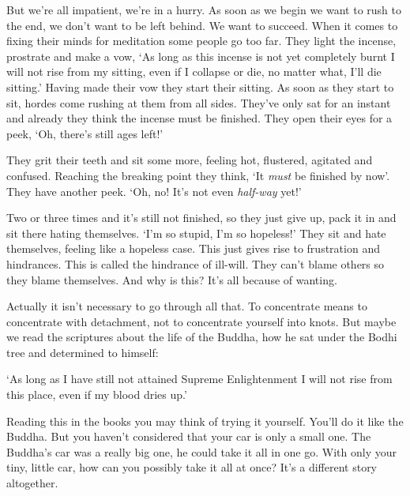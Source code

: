 But we're all impatient, we're in a hurry. As soon as we begin we want to rush to the end, we don't want to be left behind. We want to succeed. When it comes to fixing their minds for meditation some people go too far. They light the incense, prostrate and make a vow, `As long as this incense is not yet completely burnt I will not rise from my sitting, even if I collapse or die, no matter what, I'll die sitting.' Having made their vow they start their sitting. As soon as they start to sit,  hordes come rushing at them from all sides. They've only sat for an instant and already they think the incense must be finished. They open their eyes for a peek, `Oh, there's still ages left!' 

They grit their teeth and sit some more, feeling hot, flustered, agitated and confused. Reaching the breaking point they think, `It \textit{must} be finished by now'. They have another peek. `Oh, no! It's not even \textit{half-way} yet!' 

Two or three times and it's still not finished, so they just give up, pack it in and sit there hating themselves. `I'm so stupid, I'm so hopeless!' They sit and hate themselves, feeling like a hopeless case. This just gives rise to frustration and hindrances. This is called the hindrance of ill-will. They can't blame others so they blame themselves. And why is this? It's all because of wanting. 

Actually it isn't necessary to go through all that. To concentrate means to concentrate with detachment, not to concentrate yourself into knots. But maybe we read the scriptures about the life of the Buddha, how he sat under the Bodhi tree and determined to himself: 

`As long as I have still not attained Supreme Enlightenment I will not rise from this place, even if my blood dries up.' 

Reading this in the books you may think of trying it yourself. You'll do it like the Buddha. But you haven't considered that your car is only a small one. The Buddha's car was a really big one, he could take it all in one go. With only your tiny, little car, how can you possibly take it all at once? It's a different story altogether. 

